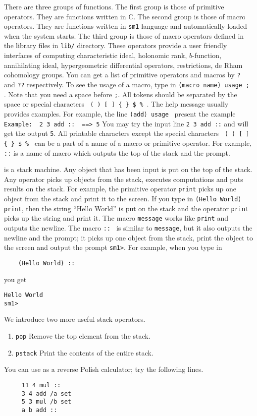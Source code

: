 There are three groups of functions. 
The first group is those of primitive operators.
They are functions written in C.
The second group is those of macro operators.
They are functions written in {\tt sm1} language and automatically
loaded when the system starts.
The third group is those of macro operators defined in the library files
in {\tt lib/} directory.
These operators provide a user friendly interfaces of computing
characteristic ideal, holonomic rank, $b$-function, annihilating
ideal, hypergeometric differential operators,
restrictions, de Rham cohomology groups.
You can get a list of primitive operators and macros
by {\tt ?} and {\tt ??} respectively.
To see the usage of a macro, type in
{\tt (macro name) usage ; }.
Note that you need a space before {\tt ;}.
All tokens should be separated by the space
or special characters \verb+ ( ) [ ] { } $ % +.
The help message usually provides examples.
For example, the line
{\tt (add) usage } present the example
\verb+ Example:  2 3 add ::  ==> 5+
You may try the input line
{\tt 2 3 add ::}
and will get the output {\tt 5}.
All printable characters except the special characters
\verb+ ( ) [ ] { } $ % +
can be a part of a name
of a macro or primitive operator.
For example, {\tt ::} is a name of macro which
outputs the top of the stack and the prompt.


\kansm is a stack machine.
Any object that has been input is put on the top of the stack.
Any operator picks up objects from the stack, executes computations and
puts results on the stack.
For example, the primitive operator {\tt print} picks up one object
from the stack and print it to the screen.
If you type in
{\tt (Hello World) print},
then the string ``Hello World'' is put on the stack and the operator
{\tt print} picks up the string and print it.
The macro {\tt message} works like {\tt print} and outputs the newline.
The macro {\tt :: } is similar to {\tt message}, 
but it also outputs the newline and the prompt;
it picks up one object from the stack, print the object to the screen and
output the prompt {\tt sm1>}.
For example, when you type in
\begin{verbatim}
    (Hello World) ::
\end{verbatim}
you get
\begin{verbatim}
Hello World
sm1>
\end{verbatim}
We introduce two more useful stack operators.
\begin{enumerate}
\item[] {\tt pop} \quad Remove the top element from the stack.
\item[] {\tt pstack} \quad Print the contents of the entire stack.
\end{enumerate}
You can use \kansm as a reverse Polish calculator; try the following lines.
\begin{verbatim}
     11 4 mul ::
     3 4 add /a set
     5 3 mul /b set
     a b add ::
\end{verbatim}

